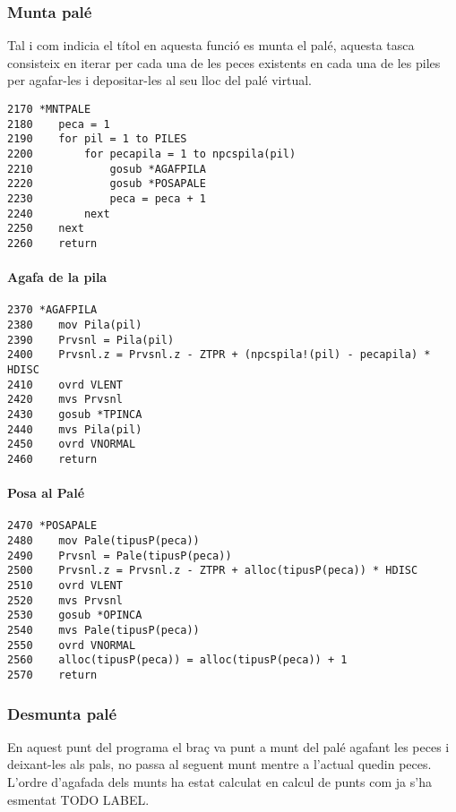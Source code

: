 \subsubsection{Munta palé}
Tal i com indicia el títol en aquesta funció es munta el palé, aquesta tasca consisteix en iterar
per cada una de les peces existents en cada una de les piles per agafar-les i depositar-les al seu lloc
del palé virtual.

\begin{verbatim}
2170 *MNTPALE
2180    peca = 1
2190    for pil = 1 to PILES 
2200        for pecapila = 1 to npcspila(pil)
2210            gosub *AGAFPILA
2220            gosub *POSAPALE
2230            peca = peca + 1
2240        next
2250    next
2260    return
\end{verbatim}

\paragraph{Agafa de la pila}
\begin{verbatim}
2370 *AGAFPILA
2380    mov Pila(pil)
2390    Prvsnl = Pila(pil)
2400    Prvsnl.z = Prvsnl.z - ZTPR + (npcspila!(pil) - pecapila) * HDISC
2410    ovrd VLENT
2420    mvs Prvsnl
2430    gosub *TPINCA
2440    mvs Pila(pil)
2450    ovrd VNORMAL
2460    return
\end{verbatim}

\paragraph{Posa al Palé}
\begin{verbatim}
2470 *POSAPALE
2480    mov Pale(tipusP(peca))
2490    Prvsnl = Pale(tipusP(peca))
2500    Prvsnl.z = Prvsnl.z - ZTPR + alloc(tipusP(peca)) * HDISC
2510    ovrd VLENT
2520    mvs Prvsnl
2530    gosub *OPINCA
2540    mvs Pale(tipusP(peca))
2550    ovrd VNORMAL
2560    alloc(tipusP(peca)) = alloc(tipusP(peca)) + 1
2570    return
\end{verbatim}

\subsubsection{Desmunta palé}
En aquest punt del programa el braç va punt a munt del palé agafant les peces
i deixant-les als pals, no passa al seguent munt mentre a l'actual quedin peces.
L'ordre d'agafada dels munts ha estat calculat en calcul de punts com ja s'ha
esmentat TODO LABEL.

